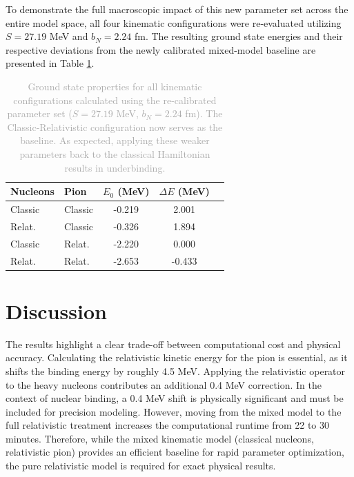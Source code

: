 \documentclass[a4paper,oneside,article,12pt]{memoir}
\begin{document}
To demonstrate the full macroscopic impact of this new parameter set across the entire model space, all four kinematic configurations were re-evaluated utilizing $S = 27.19$ MeV and $b_N = 2.24$ fm. The resulting ground state energies and their respective deviations from the newly calibrated mixed-model baseline are presented in Table \ref{tab:recal_kinematics}.

\begin{table}[H]
    \centering
    \renewcommand{\arraystretch}{1.2}
    \begin{tabular}{ll ccc}
        \hline
        \textbf{Nucleons} & \textbf{Pion} & \textbf{$E_0$ (MeV)} & \textbf{$\Delta E$ (MeV)} \\
        \hline
        Classic & Classic & -0.219 &    2.001  \\
        Relat.  & Classic & -0.326 &    1.894 \\
        Classic & Relat.  & -2.220 &    0.000 \\
        Relat.  & Relat.  & -2.653 &   -0.433 \\
        \hline
    \end{tabular}
    \caption{\textcolor{darkgray}{Ground state properties for all kinematic configurations calculated using the re-calibrated parameter set ($S = 27.19$ MeV, $b_N = 2.24$ fm). The Classic-Relativistic configuration now serves as the baseline. As expected, applying these weaker parameters back to the classical Hamiltonian results in underbinding.}}
    \label{tab:recal_kinematics}
\end{table}

\vspace{10pt}
\chapter{Discussion}
The results highlight a clear trade-off between computational cost and physical accuracy. Calculating the relativistic kinetic energy for the pion is essential, as it shifts the binding energy by roughly 4.5 MeV. Applying the relativistic operator to the heavy nucleons contributes an additional 0.4 MeV correction. In the context of nuclear binding, a 0.4 MeV shift is physically significant and must be included for precision modeling. However, moving from the mixed model to the full relativistic treatment increases the computational runtime from 22 to 30 minutes. Therefore, while the mixed kinematic model (classical nucleons, relativistic pion) provides an efficient baseline for rapid parameter optimization, the pure relativistic model is required for exact physical results.
\end{document}
